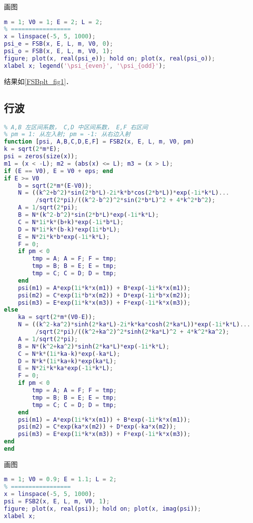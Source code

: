 画图
\begin{lstlisting}[language=matlab]
% === 设置参数 =====
m = 1; V0 = 1; E = 2; L = 2;
% =================
x = linspace(-5, 5, 1000);
psi_e = FSB(x, E, L, m, V0, 0);
psi_o = FSB(x, E, L, m, V0, 1);
figure; plot(x, real(psi_e)); hold on; plot(x, real(psi_o));
xlabel x; legend('\psi_{even}', '\psi_{odd}');
\end{lstlisting}
结果如\autoref{FSBplt_fig1}．

\subsection{行波}

\begin{lstlisting}[language=matlab, caption=FSB2.m]
% m 质量，V0 势垒，E 能量， L 势垒半宽， odd 奇函数 true 偶函数 false
% A,B 左区间系数， C,D 中区间系数， E,F 右区间
% pm = 1: 从左入射; pm = -1: 从右边入射
function [psi, A,B,C,D,E,F] = FSB2(x, E, L, m, V0, pm)
k = sqrt(2*m*E);
psi = zeros(size(x));
m1 = (x < -L); m2 = (abs(x) <= L); m3 = (x > L);
if (E == V0), E = V0 + eps; end
if E >= V0
    b = sqrt(2*m*(E-V0));
    N = ((k^2+b^2)*sin(2*b*L)-2i*k*b*cos(2*b*L))*exp(-1i*k*L)...
         /sqrt(2*pi)/((k^2-b^2)^2*sin(2*b*L)^2 + 4*k^2*b^2);
    A = 1/sqrt(2*pi);
    B = N*(k^2-b^2)*sin(2*b*L)*exp(-1i*k*L);
    C = N*1i*k*(b+k)*exp(-1i*b*L);
    D = N*1i*k*(b-k)*exp(1i*b*L);
    E = N*2i*k*b*exp(-1i*k*L);
    F = 0;
    if pm < 0
        tmp = A; A = F; F = tmp;
        tmp = B; B = E; E = tmp;
        tmp = C; C = D; D = tmp;
    end
    psi(m1) = A*exp(1i*k*x(m1)) + B*exp(-1i*k*x(m1));
    psi(m2) = C*exp(1i*b*x(m2)) + D*exp(-1i*b*x(m2));
    psi(m3) = E*exp(1i*k*x(m3)) + F*exp(-1i*k*x(m3));
else
    ka = sqrt(2*m*(V0-E));
    N = ((k^2-ka^2)*sinh(2*ka*L)-2i*k*ka*cosh(2*ka*L))*exp(-1i*k*L)...
         /sqrt(2*pi)/((k^2+ka^2)^2*sinh(2*ka*L)^2 + 4*k^2*ka^2);
    A = 1/sqrt(2*pi);
    B = N*(k^2+ka^2)*sinh(2*ka*L)*exp(-1i*k*L);
    C = N*k*(1i*ka-k)*exp(-ka*L);
    D = N*k*(1i*ka+k)*exp(ka*L);
    E = N*2i*k*ka*exp(-1i*k*L);
    F = 0;
    if pm < 0
        tmp = A; A = F; F = tmp;
        tmp = B; B = E; E = tmp;
        tmp = C; C = D; D = tmp;
    end
    psi(m1) = A*exp(1i*k*x(m1)) + B*exp(-1i*k*x(m1));
    psi(m2) = C*exp(ka*x(m2)) + D*exp(-ka*x(m2));
    psi(m3) = E*exp(1i*k*x(m3)) + F*exp(-1i*k*x(m3));
end
end

\end{lstlisting}

画图
\begin{lstlisting}[language=matlab]
% === 设置参数 =====
m = 1; V0 = 0.9; E = 1.1; L = 2;
% =================
x = linspace(-5, 5, 1000);
psi = FSB2(x, E, L, m, V0, 1);
figure; plot(x, real(psi)); hold on; plot(x, imag(psi));
xlabel x;
\end{lstlisting}
